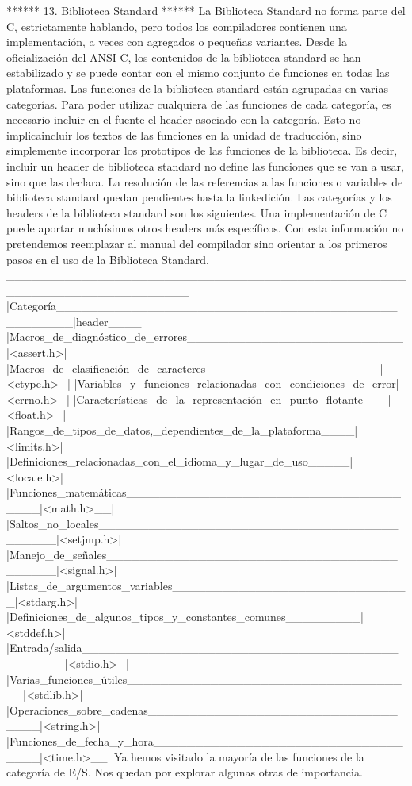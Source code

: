



****** 13. Biblioteca Standard ******
La Biblioteca Standard no forma parte del C, estrictamente hablando, pero todos
los compiladores contienen una implementación, a veces con agregados o pequeñas
variantes. Desde la oficialización del ANSI C, los contenidos de la biblioteca
standard se han estabilizado y se puede contar con el mismo conjunto de
funciones en todas las plataformas.
Las funciones de la biblioteca standard están agrupadas en varias categorías.
Para poder utilizar cualquiera de las funciones de cada categoría, es necesario
incluir en el fuente el header asociado con la categoría. Esto no
implicaincluir los textos de las funciones en la unidad de traducción, sino
simplemente incorporar los prototipos de las funciones de la biblioteca. Es
decir, incluir un header de biblioteca standard no define las funciones que se
van a usar, sino que las declara. La resolución de las referencias a las
funciones o variables de biblioteca standard quedan pendientes hasta la
linkedición.
Las categorías y los headers de la biblioteca standard son los siguientes. Una
implementación de C puede aportar muchísimos otros headers más específicos. Con
esta información no pretendemos reemplazar al manual del compilador sino
orientar a los primeros pasos en el uso de la Biblioteca Standard.
 ______________________________________________________________________
|Categoría_________________________________________________|header____|
|Macros_de_diagnóstico_de_errores__________________________|<assert.h>|
|Macros_de_clasificación_de_caracteres_____________________|<ctype.h>_|
|Variables_y_funciones_relacionadas_con_condiciones_de_error|<errno.h>_|
|Características_de_la_representación_en_punto_flotante___|<float.h>_|
|Rangos_de_tipos_de_datos,_dependientes_de_la_plataforma____|<limits.h>|
|Definiciones_relacionadas_con_el_idioma_y_lugar_de_uso_____|<locale.h>|
|Funciones_matemáticas_____________________________________|<math.h>__|
|Saltos_no_locales__________________________________________|<setjmp.h>|
|Manejo_de_señales_________________________________________|<signal.h>|
|Listas_de_argumentos_variables_____________________________|<stdarg.h>|
|Definiciones_de_algunos_tipos_y_constantes_comunes_________|<stddef.h>|
|Entrada/salida_____________________________________________|<stdio.h>_|
|Varias_funciones_útiles___________________________________|<stdlib.h>|
|Operaciones_sobre_cadenas__________________________________|<string.h>|
|Funciones_de_fecha_y_hora__________________________________|<time.h>__|
Ya hemos visitado la mayoría de las funciones de la categoría de E/S. Nos
quedan por explorar algunas otras de importancia.


